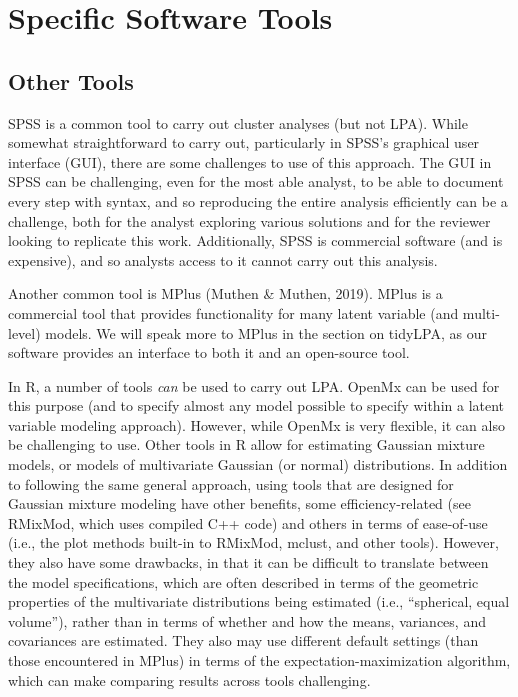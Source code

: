 \documentclass[man]{apa6}
\begin{document}
\hypertarget{specific-software-tools}{%
\section{Specific Software Tools}\label{specific-software-tools}}

\hypertarget{other-tools}{%
\subsection{Other Tools}\label{other-tools}}

SPSS is a common tool to carry out cluster analyses (but not LPA). While
somewhat straightforward to carry out, particularly in SPSS's graphical user
interface (GUI), there are some challenges to use of this approach. The GUI in
SPSS can be challenging, even for the most able analyst, to be able to document
every step with syntax, and so reproducing the entire analysis efficiently can
be a challenge, both for the analyst exploring various solutions and for the
reviewer looking to replicate this work. Additionally, SPSS is commercial
software (and is expensive), and so analysts access to it cannot carry out this
analysis.

Another common tool is MPlus (Muthen \& Muthen, 2019). MPlus is a commercial tool
that provides functionality for many latent variable (and multi-level) models.
We will speak more to MPlus in the section on tidyLPA, as our software provides
an interface to both it and an open-source tool.

In R, a number of tools \emph{can} be used to carry out LPA. OpenMx can be used for
this purpose (and to specify almost any model possible to specify within a
latent variable modeling approach). However, while OpenMx is very flexible, it
can also be challenging to use. Other tools in R allow for estimating Gaussian
mixture models, or models of multivariate Gaussian (or normal) distributions. In
addition to following the same general approach, using tools that are designed
for Gaussian mixture modeling have other benefits, some efficiency-related (see
RMixMod, which uses compiled C++ code) and others in terms of ease-of-use (i.e.,
the plot methods built-in to RMixMod, mclust, and other tools). However, they
also have some drawbacks, in that it can be difficult to translate between the
model specifications, which are often described in terms of the geometric
properties of the multivariate distributions being estimated (i.e., \enquote{spherical,
equal volume}), rather than in terms of whether and how the means, variances,
and covariances are estimated. They also may use different default settings
(than those encountered in MPlus) in terms of the expectation-maximization
algorithm, which can make comparing results across tools challenging.
\end{document}
